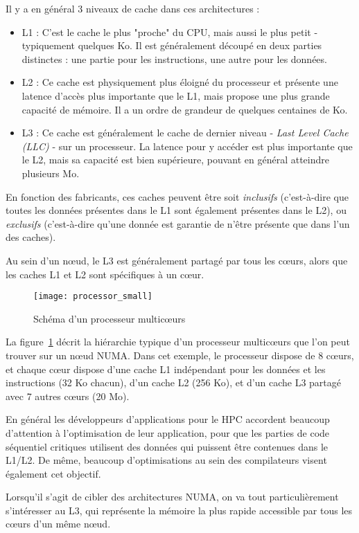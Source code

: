 Il y a en général 3 niveaux de cache dans ces architectures :
\begin{itemize}
  \item L1 : C'est le cache le plus "proche" du CPU, mais aussi le plus petit - typiquement quelques Ko. Il est généralement découpé en deux parties distinctes : une partie pour les instructions, une autre pour les données.
  \item L2 : Ce cache est physiquement plus éloigné du processeur et présente une latence d'accès plus importante que le L1, mais propose une plus grande capacité de mémoire. Il a un ordre de grandeur de quelques centaines de Ko.
  \item L3 : Ce cache est généralement le cache de dernier niveau - \emph{Last Level Cache (LLC)} - sur un processeur. La latence pour y accéder est plus importante que le L2, mais sa capacité est bien supérieure, pouvant en général atteindre plusieurs Mo.
\end{itemize}

En fonction des fabricants, ces caches peuvent être soit \emph{inclusifs} (c'est-à-dire que toutes les données présentes dans le L1 sont également présentes dans le L2), ou \emph{exclusifs} (c'est-à-dire qu'une donnée est garantie de n'être présente que dans l'un des caches).

Au sein d'un nœud, le L3 est généralement partagé par tous les cœurs, alors que les caches L1 et L2 sont spécifiques à un cœur.

\begin{figure}[ht]
  \centering
  \texttt{[image: processor\_small]}
  \caption{Schéma d'un processeur multicœurs}\label{fig:context:schema-caches}
\end{figure}

La figure~\ref{fig:context:schema-caches} décrit la hiérarchie typique d'un processeur multicœurs que l'on peut trouver sur un nœud NUMA.
Dans cet exemple, le processeur dispose de 8 cœurs, et chaque cœur dispose d'une cache L1 indépendant pour les données et les instructions (32 Ko chacun), d'un cache L2 (256 Ko), et d'un cache L3 partagé avec 7 autres cœurs (20 Mo).


En général les développeurs d'applications pour le HPC accordent beaucoup d'attention à l'optimisation de leur application, pour que les parties de code séquentiel critiques utilisent des données qui puissent être contenues dans le L1/L2.
De même, beaucoup d'optimisations au sein des compilateurs visent également cet objectif.

Lorsqu'il s'agit de cibler des architectures NUMA, on va tout particulièrement s'intéresser au L3, qui représente la mémoire la plus rapide accessible par tous les cœurs d'un même nœud.

